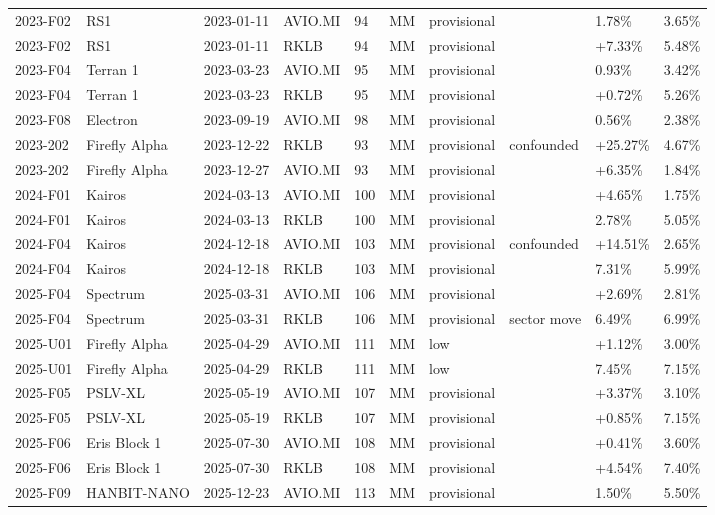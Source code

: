 \documentclass[12pt,a4paper]{article}
\begin{document}
{\begin{xltabular}{\textwidth}{lllllllXll}
2023-F02 & RS1 & 2023-01-11 & AVIO.MI & 94 & MM & provisional &  & \textminus{}1.78\% & 3.65\% \\
2023-F02 & RS1 & 2023-01-11 & RKLB & 94 & MM & provisional &  & +7.33\% & 5.48\% \\
2023-F04 & Terran 1 & 2023-03-23 & AVIO.MI & 95 & MM & provisional &  & \textminus{}0.93\% & 3.42\% \\
2023-F04 & Terran 1 & 2023-03-23 & RKLB & 95 & MM & provisional &  & +0.72\% & 5.26\% \\
2023-F08 & Electron & 2023-09-19 & AVIO.MI & 98 & MM & provisional &  & \textminus{}0.56\% & 2.38\% \\
2023-202 & Firefly Alpha & 2023-12-22 & RKLB & 93 & MM & provisional & confounded & +25.27\% & 4.67\% \\
2023-202 & Firefly Alpha & 2023-12-27 & AVIO.MI & 93 & MM & provisional &  & +6.35\% & 1.84\% \\
2024-F01 & Kairos & 2024-03-13 & AVIO.MI & 100 & MM & provisional &  & +4.65\% & 1.75\% \\
2024-F01 & Kairos & 2024-03-13 & RKLB & 100 & MM & provisional &  & \textminus{}2.78\% & 5.05\% \\
2024-F04 & Kairos & 2024-12-18 & AVIO.MI & 103 & MM & provisional & confounded & +14.51\% & 2.65\% \\
2024-F04 & Kairos & 2024-12-18 & RKLB & 103 & MM & provisional &  & \textminus{}7.31\% & 5.99\% \\
2025-F04 & Spectrum & 2025-03-31 & AVIO.MI & 106 & MM & provisional &  & +2.69\% & 2.81\% \\
2025-F04 & Spectrum & 2025-03-31 & RKLB & 106 & MM & provisional & sector move & \textminus{}6.49\% & 6.99\% \\
2025-U01 & Firefly Alpha & 2025-04-29 & AVIO.MI & 111 & MM & low &  & +1.12\% & 3.00\% \\
2025-U01 & Firefly Alpha & 2025-04-29 & RKLB & 111 & MM & low &  & \textminus{}7.45\% & 7.15\% \\
2025-F05 & PSLV-XL & 2025-05-19 & AVIO.MI & 107 & MM & provisional &  & +3.37\% & 3.10\% \\
2025-F05 & PSLV-XL & 2025-05-19 & RKLB & 107 & MM & provisional &  & +0.85\% & 7.15\% \\
2025-F06 & Eris Block 1 & 2025-07-30 & AVIO.MI & 108 & MM & provisional &  & +0.41\% & 3.60\% \\
2025-F06 & Eris Block 1 & 2025-07-30 & RKLB & 108 & MM & provisional &  & +4.54\% & 7.40\% \\
2025-F09 & HANBIT-NANO & 2025-12-23 & AVIO.MI & 113 & MM & provisional &  & \textminus{}1.50\% & 5.50\% \\

\end{xltabular}}
\end{document}
